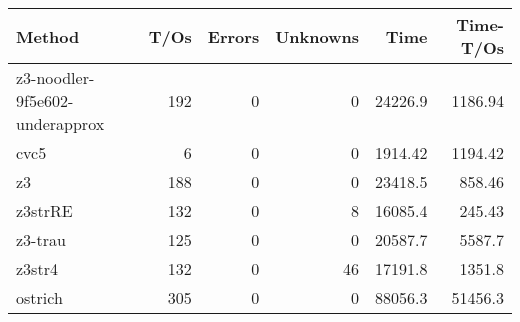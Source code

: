 \begin{tabular}{lrrrrr}
\hline
 Method                         &   T/Os &   Errors &   Unknowns &     Time &   Time-T/Os \\
\hline
 z3-noodler-9f5e602-underapprox &    192 &        0 &          0 & 24226.9  &     1186.94 \\
 cvc5                           &      6 &        0 &          0 &  1914.42 &     1194.42 \\
 z3                             &    188 &        0 &          0 & 23418.5  &      858.46 \\
 z3strRE                        &    132 &        0 &          8 & 16085.4  &      245.43 \\
 z3-trau                        &    125 &        0 &          0 & 20587.7  &     5587.7  \\
 z3str4                         &    132 &        0 &         46 & 17191.8  &     1351.8  \\
 ostrich                        &    305 &        0 &          0 & 88056.3  &    51456.3  \\
\hline
\end{tabular}
